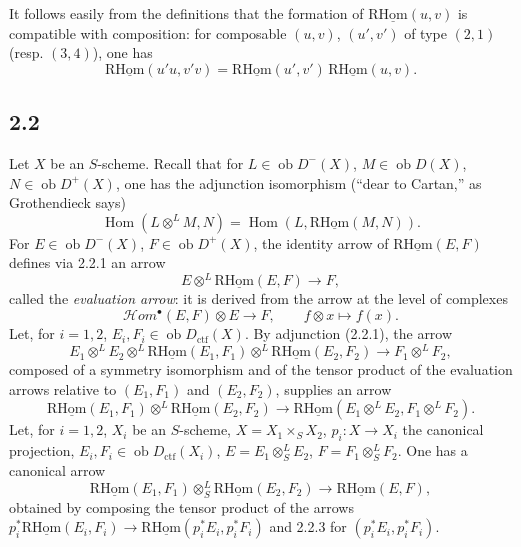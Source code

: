 \documentclass[11pt]{article}
\DeclareMathOperator{\Hom}{Hom}
\newcommand{\ob}{\operatorname{ob}}
\providecommand{\ctf}{\mathrm{ctf}}
\providecommand{\Hom}{\operatorname{Hom}}
\providecommand{\ob}{\operatorname{ob}}
\providecommand{\Hom}{\operatorname{Hom}}
\begin{document}
It follows easily from the definitions that the formation of $\mathrm{R}\underline{\mathrm{Hom}}(u,v)$ is compatible with composition: for composable $(u,v)$, $(u',v')$ of type $(2,1)$ (resp. $(3,4)$), one has
\begin{equation}\tag{2.1.6}
\mathrm{R}\underline{\mathrm{Hom}}(u'u,v'v)=\mathrm{R}\underline{\mathrm{Hom}}(u',v')\,\mathrm{R}\underline{\mathrm{Hom}}(u,v).
\end{equation}

\subsection*{2.2}
Let $X$ be an $S$-scheme. Recall that for $L\in\ob D^{-}(X)$, $M\in\ob D(X)$, $N\in\ob D^{+}(X)$, one has the adjunction isomorphism (``dear to Cartan,'' as Grothendieck says)
\begin{equation}\tag{2.2.1}
\Hom(L\otimes^{L}M,N)=\Hom(L,\mathrm{R}\underline{\mathrm{Hom}}(M,N)).
\end{equation}
For $E\in\ob D^{-}(X)$, $F\in\ob D^{+}(X)$, the identity arrow of $\mathrm{R}\underline{\mathrm{Hom}}(E,F)$ defines via 2.2.1 an arrow
\begin{equation}\tag{2.2.2}
E\otimes^{L}\mathrm{R}\underline{\mathrm{Hom}}(E,F)\longrightarrow F,
\end{equation}
called the \emph{evaluation arrow}: it is derived from the arrow at the level of complexes
\[
\mathcal Hom^{\bullet}(E,F)\otimes E\longrightarrow F,
\qquad f\otimes x\longmapsto f(x).
\]
Let, for $i=1,2$, $E_i,F_i\in\ob D_{\ctf}(X)$. By adjunction (2.2.1), the arrow
\[
E_1\otimes^{L}E_2\otimes^{L}\mathrm{R}\underline{\mathrm{Hom}}(E_1,F_1)\otimes^{L}\mathrm{R}\underline{\mathrm{Hom}}(E_2,F_2)\longrightarrow F_1\otimes^{L}F_2,
\]
composed of a symmetry isomorphism and of the tensor product of the evaluation arrows relative to $(E_1,F_1)$ and $(E_2,F_2)$, supplies an arrow
\begin{equation}\tag{2.2.3}
\mathrm{R}\underline{\mathrm{Hom}}(E_1,F_1)\otimes^{L}\mathrm{R}\underline{\mathrm{Hom}}(E_2,F_2)\longrightarrow\mathrm{R}\underline{\mathrm{Hom}}(E_1\otimes^{L}E_2,F_1\otimes^{L}F_2).
\end{equation}
Let, for $i=1,2$, $X_i$ be an $S$-scheme, $X=X_1\times_SX_2$, $p_i:X\to X_i$ the canonical projection, $E_i,F_i\in\ob D_{\ctf}(X_i)$, $E=E_1\otimes^{L}_{S}E_2$, $F=F_1\otimes^{L}_{S}F_2$. One has a canonical arrow
\begin{equation}\tag{2.2.4}
\mathrm{R}\underline{\mathrm{Hom}}(E_1,F_1)\otimes^{L}_{S}\mathrm{R}\underline{\mathrm{Hom}}(E_2,F_2)\longrightarrow\mathrm{R}\underline{\mathrm{Hom}}(E,F),
\end{equation}
obtained by composing the tensor product of the arrows $p_i^{*}\mathrm{R}\underline{\mathrm{Hom}}(E_i,F_i)\to\mathrm{R}\underline{\mathrm{Hom}}(p_i^{*}E_i,p_i^{*}F_i)$ and 2.2.3 for $(p_i^{*}E_i,p_i^{*}F_i)$.
\end{document}
